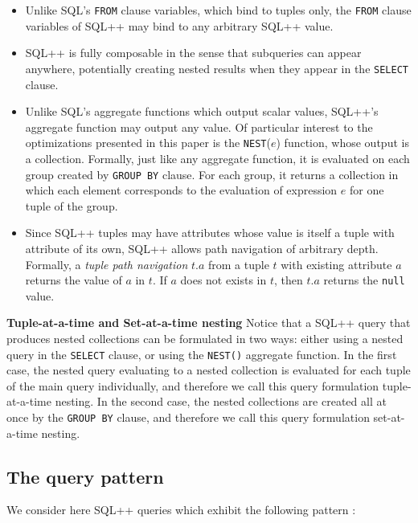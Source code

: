 \begin{itemize}
\item Unlike SQL's \texttt{FROM} clause variables, which bind to tuples
only, the \texttt{FROM} clause variables of SQL++ may bind to any
arbitrary SQL++ value.
\item  SQL++ is fully composable in the sense that subqueries
can appear anywhere, potentially creating nested results
when they appear in the \texttt{SELECT} clause.
\item Unlike SQL's aggregate functions which output scalar values, SQL++'s aggregate function may output any value. Of particular interest to the optimizations presented in this paper is the \texttt{NEST}($e$) function, whose output is a collection. Formally, just like any aggregate function, it is evaluated on each group created by \texttt{GROUP BY} clause. For each group, it returns a collection in which each element corresponds to the evaluation of expression $e$ for one tuple of the group.
\item Since SQL++ tuples may have attributes whose value is itself a tuple with attribute of its own, SQL++ allows path navigation of arbitrary depth. Formally, a \emph{tuple path navigation} $t.a$ from a tuple $t$ with existing attribute $a$ returns the value of $a$ in $t$. If $a$ does not exists in $t$, then $t.a$ returns the \texttt{null} value. 
\end{itemize}

\textbf{Tuple-at-a-time and Set-at-a-time nesting} Notice that a SQL++ query that produces nested collections can be formulated in two ways: either using a nested query in the \texttt{SELECT} clause, or using the \texttt{NEST()} aggregate function. In the first case, the nested query evaluating to a nested collection is evaluated for each tuple of the main query individually, and therefore we call this query formulation tuple-at-a-time nesting. In the second case, the nested collections are created all at once by the \texttt{GROUP BY} clause, and therefore we call this query formulation set-at-a-time nesting.

\subsection{The query pattern}

We consider here SQL++ queries which exhibit the following pattern :



